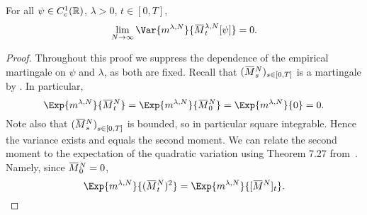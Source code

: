 \begin{proposition}\label{prop:vanishing-variance}  %
  For all \(\psi \in C_c^1(\mathbb{R})\), \(\lambda > 0\), \(t \in [0,T]\),
  \begin{equation}
    \lim_{N\to\infty} \Var{\lawmu^{\lambda,N}}{\ol{M}_t^{\lambda,N}[\psi]} = 0.
  \end{equation}
\end{proposition}
\begin{proof}
  Throughout this proof we suppress the dependence of the empirical martingale on \( \psi \) and \( \lambda \), as both are fixed.
  Recall that \((\ol{M}_s^N)_{s\in[0,T]}\) is a martingale by .
  In particular,
  \begin{equation}
    \Exp{\lawmu^{\lambda,N}}{\ol{M}_t^N} = \Exp{\lawmu^{\lambda,N}}{\ol{M}_0^N}
    = \Exp{\lawmu^{\lambda,N}}{0} = 0.    %
  \end{equation}
  Note also that \({(\ol{M}_s^N)}_{s\in[0,T]}\) is bounded, so in particular square integrable.
  Hence the variance exists and equals the second moment.
  We can relate the second moment to the expectation of the quadratic variation using Theorem 7.27 from~\cite[201]{klebanerIntroductionStochasticCalculus2012}.
  Namely, since \(\ol{M}_0^N = 0\),
  \begin{equation}
    \Exp{\lawmu^{\lambda,N}}{(\ol{M}_t^N)^2} = \Exp{\lawmu^{\lambda,N}}{\sbr{\ol{M}^N}_t}.
  \end{equation}


\end{proof}
